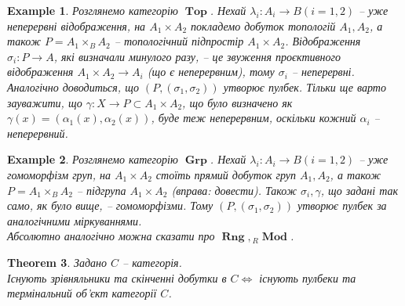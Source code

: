 \documentclass[a4paper, 10pt]{article}
\theoremstyle{theoremdd}
\newtheorem{theorem}{Theorem}[subsection]
\newtheorem{example}[theorem]{Example}
\DeclareMathOperator{\Grp}{\textbf{Grp}}
\DeclareMathOperator{\Rng}{\textbf{Rng}}
\DeclareMathOperator{\Top}{\textbf{Top}}
\DeclareMathOperator{\Mod}{\textbf{Mod}}
\begin{document}
\begin{example}
Розглянемо категорію $\Top$. Нехай $\lambda_i \colon A_i \to B (i = 1,2)$ -- уже неперервні відображення, на $A_1 \times A_2$ покладемо добуток топологій $A_1,A_2$, а також $P = A_1 \times_B A_2$ -- топологічний підпростір $A_1 \times A_2$. Відображення $\sigma_i \colon P \to A$, які визначали минулого разу, -- це звуження проєктивного відображення $A_1 \times A_2 \to A_i$ (що є неперервним), тому $\sigma_i$ -- неперервні. Аналогічно доводиться, що $(P,(\sigma_1,\sigma_2))$ утворює пулбек. Тільки ще варто зауважити, що $\gamma \colon X \to P \subset A_1 \times A_2$, що було визначено як $\gamma(x) = (\alpha_1(x),\alpha_2(x))$, буде теж неперервним, оскільки кожний $\alpha_i$ -- неперервний.
\end{example}

\begin{example}
Розглянемо категорію $\Grp$. Нехай $\lambda_i \colon A_i \to B (i = 1,2)$ -- уже гомоморфізм груп, на $A_1 \times A_2$ стоїть прямий добуток груп $A_1,A_2$, а також $P = A_1 \times_B A_2$ -- підгрупа $A_1 \times A_2$ (вправа: довести). Також $\sigma_i, \gamma$, що задані так само, як було вище, -- гомоморфізми. Тому $(P,(\sigma_1,\sigma_2))$ утворює пулбек за аналогічними міркуваннями.
\bigskip \\
Абсолютно аналогічно можна сказати про $\Rng, {}_R \Mod$.
\end{example}

\begin{theorem}
Задано $C$ -- категорія.\\
Існують зрівняльники та скінченні добутки в $C \iff$ існують пулбеки та термінальний об'єкт категорії $C$.
\end{theorem}
\end{document}
